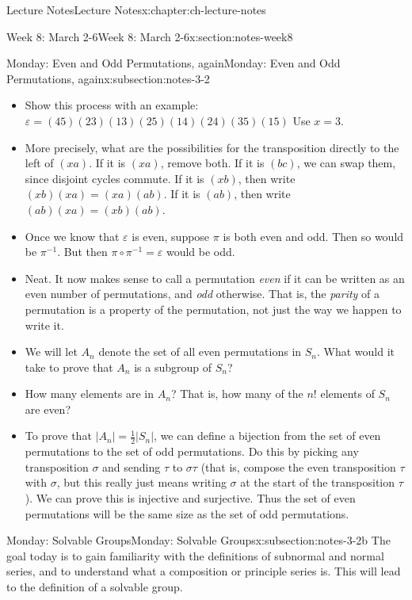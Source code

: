 \documentclass[oneside,11pt,]{book}
\begin{document}
\begin{chapterptx}{Lecture Notes}{}{Lecture Notes}{}{}{x:chapter:ch-lecture-notes}
\begin{sectionptx}{Week 8: March 2-6}{}{Week 8: March 2-6}{}{}{x:section:notes-week8}
\begin{subsectionptx}{Monday: Even and Odd Permutations, again}{}{Monday: Even and Odd Permutations, again}{}{}{x:subsection:notes-3-2}
\begin{itemize}[label=\textbullet]
\item{}Show this process with an example: \(\varepsilon = (45)(23)(13)(25)(14)(24)(35)(15)\) Use \(x = 3\).%
\item{}More precisely, what are the possibilities for the transposition directly to the left of \((xa)\). If it is \((xa)\), remove both. If it is \((bc)\), we can swap them, since disjoint cycles commute. If it is \((xb)\), then write \((xb)(xa) = (xa)(ab)\). If it is \((ab)\), then write \((ab)(xa) = (xb)(ab)\).%
\item{}Once we know that \(\varepsilon\) is even, suppose \(\pi\) is both even and odd. Then so would be \(\pi^{-1}\). But then \(\pi\circ \pi^{-1}= \varepsilon\) would be odd.%
\item{}Neat. It now makes sense to call a permutation \emph{even} if it can be written as an even number of permutations, and \emph{odd} otherwise. That is, the \emph{parity} of a permutation is a property of the permutation, not just the way we happen to write it.%
\item{}We will let \(A_n\) denote the set of all even permutations in \(S_n\). What would it take to prove that \(A_n\) is a subgroup of \(S_n\)?%
\item{}How many elements are in \(A_n\)? That is, how many of the \(n!\) elements of \(S_n\) are even?%
\item{}To prove that \(|A_n| = \frac{1}{2}|S_n|\), we can define a bijection from the set of even permutations to the set of odd permutations. Do this by picking any transposition \(\sigma\) and sending \(\tau\) to \(\sigma\tau\) (that is, compose the even transposition \(\tau\) with \(\sigma\), but this really just means writing \(\sigma\) at the start of the transposition \(\tau\)). We can prove this is injective and surjective. Thus the set of even permutations will be the same size as the set of odd permutations.%
\end{itemize}
%
\end{subsectionptx}
%
%
\typeout{************************************************}
\typeout{************************************************}
%
\begin{subsectionptx}{Monday: Solvable Groups}{}{Monday: Solvable Groups}{}{}{x:subsection:notes-3-2b}
The goal today is to gain familiarity with the definitions of subnormal and normal series, and to understand what a composition or principle series is. This will lead to the definition of a solvable group.%
\par

\end{subsectionptx}
\end{sectionptx}
\end{chapterptx}
\end{document}

